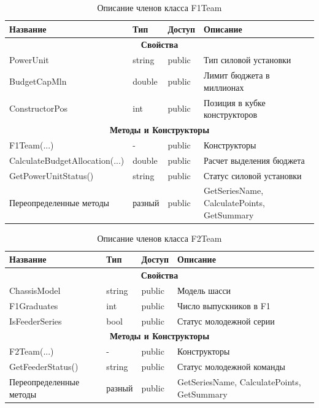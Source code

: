 \begin{table}[H]
\centering
\caption{Описание членов класса F1Team}
\begin{tabular}{|p{4.5cm}|p{3.5cm}|p{2cm}|p{5cm}|}
\hline
\textbf{Название} & \textbf{Тип} & \textbf{Доступ} & \textbf{Описание} \\ \hline
\multicolumn{4}{|c|}{\textbf{Свойства}} \\ \hline
PowerUnit & string & public & Тип силовой установки \\ \hline
BudgetCapMln & double & public & Лимит бюджета в миллионах \\ \hline
ConstructorPos & int & public & Позиция в кубке конструкторов \\ \hline
\multicolumn{4}{|c|}{\textbf{Методы и Конструкторы}} \\ \hline
F1Team(...) & - & public & Конструкторы \\ \hline
{\footnotesize CalculateBudgetAllocation(...)} & double & public & Расчет выделения бюджета \\ \hline
GetPowerUnitStatus() & string & public & Статус силовой установки \\ \hline
Переопределенные методы & разный & public & GetSeriesName, CalculatePoints, GetSummary \\ \hline
\end{tabular}
\end{table}

\begin{table}[H]
\centering
\caption{Описание членов класса F2Team}
\begin{tabular}{|p{4.5cm}|p{3.5cm}|p{2cm}|p{5cm}|}
\hline
\textbf{Название} & \textbf{Тип} & \textbf{Доступ} & \textbf{Описание} \\ \hline
\multicolumn{4}{|c|}{\textbf{Свойства}} \\ \hline
ChassisModel & string & public & Модель шасси \\ \hline
F1Graduates & int & public & Число выпускников в F1 \\ \hline
IsFeederSeries & bool & public & Статус молодежной серии \\ \hline
\multicolumn{4}{|c|}{\textbf{Методы и Конструкторы}} \\ \hline
F2Team(...) & - & public & Конструкторы \\ \hline
GetFeederStatus() & string & public & Статус молодежной команды \\ \hline
Переопределенные методы & разный & public & GetSeriesName, CalculatePoints, GetSummary \\ \hline
\end{tabular}
\end{table}

